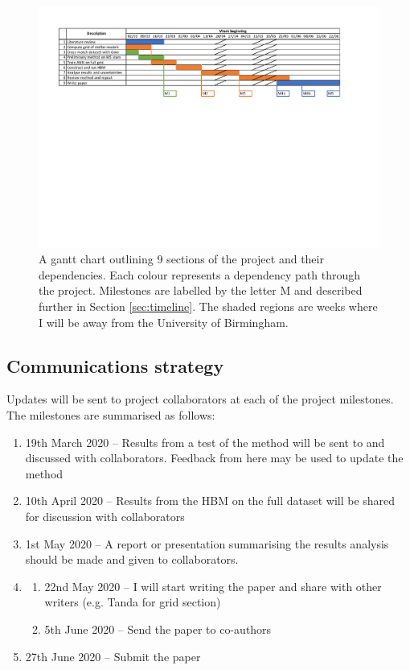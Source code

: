\documentclass[twocolumn]{aastex63}
\begin{document}
\begin{figure}[htb!]
    \includegraphics[width=1.0\textwidth,
    trim={1.5cm 13cm 3.1cm 0},clip]{figures/kepler-dwarfs_gantt.pdf}
    \caption{A gantt chart outlining 9 sections of the project and their dependencies. Each colour represents a dependency path through the project. Milestones are labelled by the letter M and described further in Section \ref{sec:timeline}. The shaded regions are weeks where I will be away from the University of Birmingham.}
    \label{fig:gantt}
\end{figure}

\subsection{Communications strategy}\label{sec:comms}

Updates will be sent to project collaborators at each of the project milestones. The milestones are summarised as follows:

\renewcommand{\labelenumi}{M\arabic{enumi}.}
\begin{enumerate}
    \item 19th March 2020 -- Results from a test of the method will be sent to and discussed with collaborators. Feedback from here may be used to update the method
    \item 10th April 2020 -- Results from the HBM on the full dataset will be shared for discussion with collaborators
    \item 1st May 2020 -- A report or presentation summarising the results analysis should be made and given to collaborators.
    \item
    \begin{enumerate}
        \item 22nd May 2020 -- I will start writing the paper and share with other writers (e.g. Tanda for grid section)
        \item 5th June 2020 -- Send the paper to co-authors
    \end{enumerate}
    \item 27th June 2020 -- Submit the paper
\end{enumerate}
\renewcommand{\labelenumi}{\arabic{enumi}.}
\end{document}
